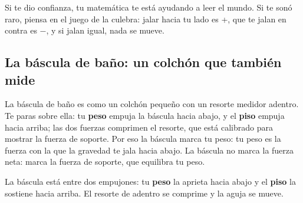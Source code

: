 \documentclass[
  spanish,
  letterpaper,
  12pt,
  oneside,
  open=any,
  DIV=15]{scrbook}
\begin{document}
\begin{tcolorbox}[enhanced jigsaw, arc=.35mm, bottomrule=.15mm, bottomtitle=1mm, breakable, colback=white, colbacktitle=quarto-callout-tip-color!10!white, colframe=quarto-callout-tip-color-frame, coltitle=black, left=2mm, leftrule=.75mm, opacityback=0, opacitybacktitle=0.6, rightrule=.15mm, title=\textcolor{quarto-callout-tip-color}{\faLightbulb}\hspace{0.5em}{Sobre la pregunta socioemocional}, titlerule=0mm, toprule=.15mm, toptitle=1mm]

Si te dio confianza, tu matemática te está ayudando a leer el mundo. Si
te sonó raro, piensa en el juego de la culebra: jalar hacia tu lado es
+, que te jalan en contra es −, y si jalan igual, nada se mueve.

\end{tcolorbox}

\subsection{La báscula de baño: un colchón que también
mide}\label{la-buxe1scula-de-bauxf1o-un-colchuxf3n-que-tambiuxe9n-mide}

La báscula de baño es como un colchón pequeño con un resorte medidor
adentro. Te paras sobre ella: tu \textcolor[HTML]{2563EB}{\textbf{peso}}
empuja la báscula hacia abajo, y el
\textcolor[HTML]{7C3AED}{\textbf{piso}} empuja hacia arriba; las dos
fuerzas comprimen el resorte, que está calibrado para mostrar la fuerza
de soporte. Por eso la báscula marca tu peso: tu peso es la fuerza con
la que la gravedad te jala hacia abajo. La báscula no marca la fuerza
neta: marca la fuerza de soporte, que equilibra tu peso.

\begin{tcolorbox}[enhanced jigsaw, arc=.35mm, bottomrule=.15mm, bottomtitle=1mm, breakable, colback=white, colbacktitle=quarto-callout-note-color!10!white, colframe=quarto-callout-note-color-frame, coltitle=black, left=2mm, leftrule=.75mm, opacityback=0, opacitybacktitle=0.6, rightrule=.15mm, title=\textcolor{quarto-callout-note-color}{\faInfo}\hspace{0.5em}{Apoyo Visual}, titlerule=0mm, toprule=.15mm, toptitle=1mm]

La báscula está entre dos empujones: tu
\textcolor[HTML]{2563EB}{\textbf{peso}} la aprieta hacia abajo y el
\textcolor[HTML]{7C3AED}{\textbf{piso}} la sostiene hacia arriba. El
resorte de adentro se comprime y la aguja se mueve.

\end{tcolorbox}
\end{document}
